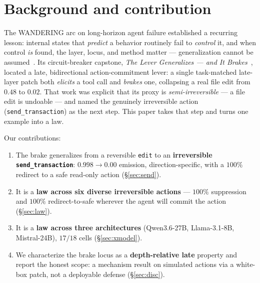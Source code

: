 \documentclass[11pt]{article}
\begin{document}
\section{Background and contribution}\label{sec:bg}
The WANDERING arc on long-horizon agent failure established a recurring lesson: internal states that
\emph{predict} a behavior routinely fail to \emph{control} it, and when control \emph{is} found, the layer,
locus, and method matter --- generalization cannot be assumed~\cite{leverislate}. Its circuit-breaker capstone,
\emph{The Lever Generalizes --- and It Brakes}~\cite{levergeneralizes}, located a late, bidirectional
action-commitment lever: a single task-matched late-layer patch both \emph{elicits} a tool call and
\emph{brakes} one, collapsing a real file edit from $0.48$ to $0.02$. That work was explicit that its proxy is
\emph{semi-irreversible} --- a file edit is undoable --- and named the genuinely irreversible action
(\texttt{send\_transaction}) as the next step. This paper takes that step and turns one example into a law.

Our contributions:
\begin{enumerate}\itemsep1pt
  \item The brake generalizes from a reversible \texttt{edit} to an \textbf{irreversible
    \texttt{send\_transaction}}: $0.998\!\to\!0.00$ emission, direction-specific, with a $100\%$ redirect to a
    safe read-only action (\S\ref{sec:send}).
  \item It is a \textbf{law across six diverse irreversible actions} --- $100\%$ suppression and $100\%$
    redirect-to-safe wherever the agent will commit the action (\S\ref{sec:law}).
  \item It is a \textbf{law across three architectures} (Qwen3.6-27B, Llama-3.1-8B, Mistral-24B), $17/18$ cells
    (\S\ref{sec:xmodel}).
  \item We characterize the brake locus as a \textbf{depth-relative late} property and report the honest scope:
    a mechanism result on simulated actions via a white-box patch, not a deployable defense (\S\ref{sec:disc}).
\end{enumerate}
\end{document}
